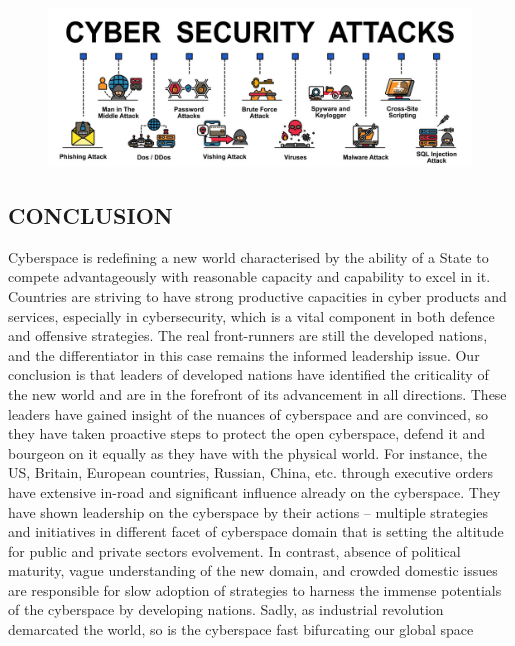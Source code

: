 \documentclass[11pt,a4paper]{article}
\begin{document}
\begin{center}
\begin{figure}[h]
			\centering
			\includegraphics[width=12 cm , height=7 cm ]{cyberattack.jpeg}
\end{figure}
\end{center}






\newpage
\begin{center}
\section{CONCLUSION}
{\setlength{\baselineskip}{1.5\baselineskip} }									
\end{center}

	Cyberspace is redefining a new world characterised by the ability of a State to compete advantageously with reasonable capacity and capability to excel in it. Countries are striving to have strong productive capacities in cyber products and  services, especially in  cybersecurity,  which is  a vital  component in  both  defence and offensive  strategies. The  real front-runners  are still  the developed  nations, and  the differentiator  in this  case remains the informed leadership issue. Our conclusion is that leaders of developed nations have  identified the criticality of  the new  world and are  in the  forefront of  its advancement  in all directions.  These leaders  have gained insight of the nuances of cyberspace and are convinced, so they have taken proactive steps to protect the
open cyberspace, defend it and bourgeon on it equally as they have with the physical world. For instance, the US, Britain, European countries, Russian, China, etc. through executive orders have extensive in-road and significant influence already on the cyberspace. They have shown leadership on the cyberspace by their actions – multiple strategies and initiatives in different facet of cyberspace domain that is setting the altitude for public and private sectors  evolvement. In  contrast,  absence of  political  maturity,  vague understanding of the new domain, and crowded domestic issues are responsible for slow adoption of strategies to harness the immense potentials of the cyberspace by developing nations. Sadly, as industrial revolution demarcated the world, so is the cyberspace fast bifurcating our global space
\end{document}
